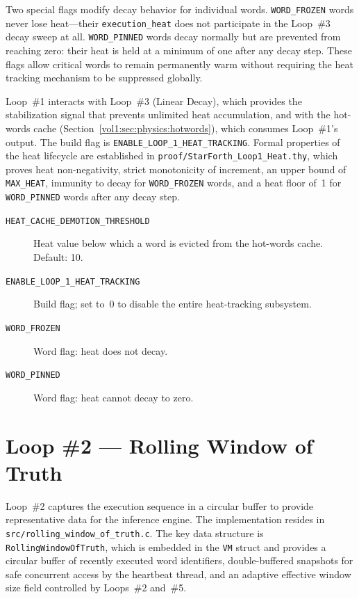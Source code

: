 Two special flags modify decay behavior for individual words.
\texttt{WORD\_FROZEN} words never lose heat---their \texttt{execution\_heat}
does not participate in the Loop~\#3 decay sweep at all. \texttt{WORD\_PINNED}
words decay normally but are prevented from reaching zero: their heat is held at
a minimum of one after any decay step. These flags allow critical words to
remain permanently warm without requiring the heat tracking mechanism to be
suppressed globally.

Loop~\#1 interacts with Loop~\#3 (Linear Decay), which provides the
stabilization signal that prevents unlimited heat accumulation, and with the
hot-words cache (Section~\ref{vol1:sec:physics:hotwords}), which consumes
Loop~\#1's output. The build flag is \texttt{ENABLE\_LOOP\_1\_HEAT\_TRACKING}.
Formal properties of the heat lifecycle are established in
\texttt{proof/StarForth\_Loop1\_Heat.thy}, which proves heat non-negativity,
strict monotonicity of increment, an upper bound of \texttt{MAX\_HEAT},
immunity to decay for \texttt{WORD\_FROZEN} words, and a heat floor of~1 for
\texttt{WORD\_PINNED} words after any decay step.

\begin{description}
  \item[\texttt{HEAT\_CACHE\_DEMOTION\_THRESHOLD}] Heat value below which a
    word is evicted from the hot-words cache. Default: 10.
  \item[\texttt{ENABLE\_LOOP\_1\_HEAT\_TRACKING}] Build flag; set to~0 to
    disable the entire heat-tracking subsystem.
  \item[\texttt{WORD\_FROZEN}] Word flag: heat does not decay.
  \item[\texttt{WORD\_PINNED}] Word flag: heat cannot decay to zero.
\end{description}

\section{Loop \#2 --- Rolling Window of Truth}
\label{vol1:sec:physics:loop2}


Loop~\#2 captures the execution sequence in a circular buffer to provide
representative data for the inference engine. The implementation resides in
\texttt{src/rolling\_window\_of\_truth.c}. The key data structure is
\texttt{RollingWindowOfTruth}, which is embedded in the \texttt{VM} struct and
provides a circular buffer of recently executed word identifiers, double-buffered
snapshots for safe concurrent access by the heartbeat thread, and an adaptive
effective window size field controlled by Loops~\#2 and~\#5.


